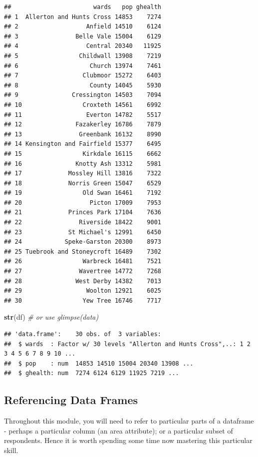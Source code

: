 \documentclass[]{book}
\newenvironment{Shaded}{\begin{snugshade}}{\end{snugshade}}
\newcommand{\KeywordTok}[1]{\textcolor[rgb]{0.13,0.29,0.53}{\textbf{#1}}}
\newcommand{\CommentTok}[1]{\textcolor[rgb]{0.56,0.35,0.01}{\textit{#1}}}
\newcommand{\NormalTok}[1]{#1}
\begin{document}
\begin{verbatim}
##                       wards   pop ghealth
## 1  Allerton and Hunts Cross 14853    7274
## 2                   Anfield 14510    6124
## 3                Belle Vale 15004    6129
## 4                   Central 20340   11925
## 5                 Childwall 13908    7219
## 6                    Church 13974    7461
## 7                  Clubmoor 15272    6403
## 8                    County 14045    5930
## 9               Cressington 14503    7094
## 10                 Croxteth 14561    6992
## 11                  Everton 14782    5517
## 12               Fazakerley 16786    7879
## 13                Greenbank 16132    8990
## 14 Kensington and Fairfield 15377    6495
## 15                 Kirkdale 16115    6662
## 16               Knotty Ash 13312    5981
## 17             Mossley Hill 13816    7322
## 18             Norris Green 15047    6529
## 19                 Old Swan 16461    7192
## 20                   Picton 17009    7953
## 21             Princes Park 17104    7636
## 22                Riverside 18422    9001
## 23             St Michael's 12991    6450
## 24            Speke-Garston 20300    8973
## 25 Tuebrook and Stoneycroft 16489    7302
## 26                 Warbreck 16481    7521
## 27                Wavertree 14772    7268
## 28               West Derby 14382    7013
## 29                  Woolton 12921    6025
## 30                 Yew Tree 16746    7717
\end{verbatim}

\begin{Shaded}
\begin{Highlighting}[]
\KeywordTok{str}\NormalTok{(df) }\CommentTok{# or use glimpse(data) }
\end{Highlighting}
\end{Shaded}

\begin{verbatim}
## 'data.frame':    30 obs. of  3 variables:
##  $ wards  : Factor w/ 30 levels "Allerton and Hunts Cross",..: 1 2 3 4 5 6 7 8 9 10 ...
##  $ pop    : num  14853 14510 15004 20340 13908 ...
##  $ ghealth: num  7274 6124 6129 11925 7219 ...
\end{verbatim}

\subsection{Referencing Data Frames}\label{referencing-data-frames}

Throughout this module, you will need to refer to particular parts of a
dataframe - perhaps a particular column (an area attribute); or a
particular subset of respondents. Hence it is worth spending some time
now mastering this particular skill.
\end{document}
